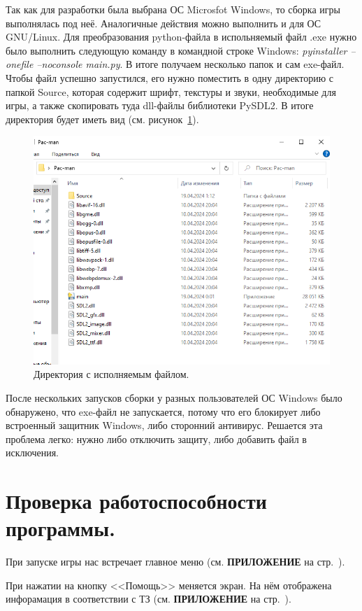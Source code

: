 Так как для разработки была выбрана ОС Microsfot Windows, то сборка игры выполнялась под неё. Аналогичные действия можно выполнить и для ОС GNU/Linux.
Для преобразования python-файла в испольняемый файл .exe нужно было выполнить следующую команду в командной строке Windows: \textsl{pyinstaller --onefile --noconsole main.py}. В итоге получаем несколько папок и сам exe-файл. Чтобы файл успешно запустился, его нужно поместить в одну директорию с папкой Source, которая содержит шрифт, текстуры и звуки, необходимые для игры, а также скопировать туда dll-файлы библиотеки PySDL2. В итоге директория будет иметь вид (см. рисунок~\ref{fig9}).
\begin{figure}[H]
	\centering
	\includegraphics[width=1\linewidth]{images/dir.png}
	\caption{Директория с исполняемым файлом.}
	\label{fig9}
\end{figure}
После нескольких запусков сборки у разных пользователей ОС Windows было обнаружено, что exe-файл не запускается, потому что его блокирует либо встроенный защитник Windows, либо сторонний антивирус. Решается эта проблема легко: нужно либо отключить защиту, либо добавить файл в исключения.

\section{\label{sec:ch02/sec02}Проверка работоспособности программы.}
При запуске игры нас встречает главное меню (см. \textbf{\textsc{ПРИЛОЖЕНИЕ}} на стр.~\pageref{fig2}).

При нажатии на кнопку <<Помощь>> меняется экран. На нём отображена инфорамация в соответствии с ТЗ (см. \textbf{\textsc{ПРИЛОЖЕНИЕ}} на стр.~\pageref{fig3}).

